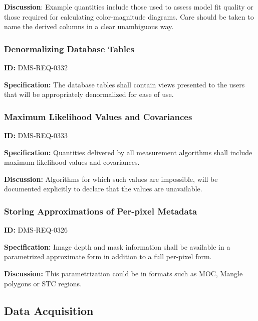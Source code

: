 \documentclass[SE,toc,lsstdraft]{lsstdoc}
\begin{document}
\textbf{Discussion}: Example quantities include those used to assess model fit quality or those required for calculating color-magnitude diagrams. Care should be taken to name the derived columns in a clear unambiguous way.




\subsubsection{Denormalizing Database Tables}

\label{DMS-REQ-0332}
\textbf{ID:} DMS-REQ-0332

\textbf{Specification:} The database tables shall contain views presented to the users that will be appropriately denormalized for ease of use.






\subsubsection{Maximum Likelihood Values and Covariances}

\label{DMS-REQ-0333}
\textbf{ID:} DMS-REQ-0333

\textbf{Specification:} Quantities delivered by all measurement algorithms shall include maximum likelihood values and covariances.

\textbf{Discussion:} Algorithms for which such values are impossible, will be documented explicitly to declare that the values are unavailable.




\subsubsection{Storing Approximations of Per-pixel Metadata}

\label{DMS-REQ-0326}
\textbf{ID:} DMS-REQ-0326

\textbf{Specification:} Image depth and mask information shall be available in a parametrized approximate form in addition to a full per-pixel form.

\textbf{Discussion:} This parametrization could be in formats such as MOC, Mangle polygons or STC regions.





\subsection{Data Acquisition}
\end{document}

